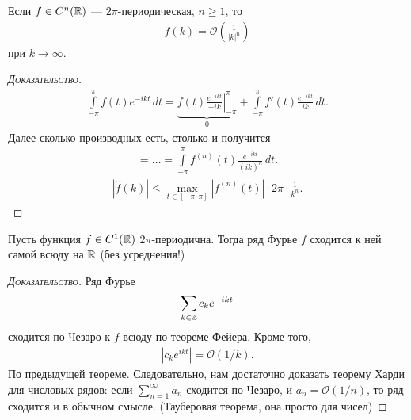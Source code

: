 \documentclass[../complex-analysis.tex]{subfiles}
\begin{document}
\begin{thm}
 Если $ f \in C^{n}(\mathbb{R}) $ --- $ 2\pi $-периодическая, $ n \geqslant 1 $, то 
 \begin{align*}
  \hat f(k) = \mathcal O\left( \frac{1}{\left| k \right|^{n}}\right)
 \end{align*} при $ k \to \infty $.
\end{thm}
\begin{proof}[\normalfont\textsc{Доказательство}]
 \begin{align*}
  \int\limits_{-\pi}^{\pi} f(t)e^{-ikt}\,dt = \underbrace{f(t) \left.\frac{e^{-ikt}}{-ik}\right|_{-\pi}^{\pi}}_{0} + \int\limits_{-\pi}^{\pi} f'(t) \frac{e^{-ikt}}{ik}\,dt.
 \end{align*} Далее сколько производных есть, столько и получится
 \begin{align*}
  = \ldots = \int\limits_{-\pi}^{\pi} f^{(n)}(t) \frac{ e^{-ikt}}{(ik)^{n}}\,dt.
 \end{align*}
 \begin{align*}
  \left| \hat f(k) \right| \leqslant \max_{t \in [-\pi,\pi]} \left| f^{(n)}(t) \right| \cdot 2\pi \cdot \frac{1}{k^{n}}.
 \end{align*}
\end{proof}

\begin{thm}[Харди]
 Пусть функция $ f \in C^{1}(\mathbb{R}) $ $ 2\pi $-периодична. Тогда ряд Фурье $ f $ сходится к ней самой всюду на $ \mathbb{R} $ (без усреднения!)
\end{thm}
\begin{proof}[\normalfont\textsc{Доказательство}]
 Ряд Фурье
 \begin{align*}
  \sum_{k \in \mathbb{Z}}c_k e^{-ikt}
 \end{align*} сходится по Чезаро к $ f $ всюду по теореме Фейера. Кроме того,
 \begin{align*}
  \left| c_ke^{ikt} \right| = \mathcal O(1 / k).
 \end{align*} По предыдущей теореме. Следовательно, нам достаточно доказать теорему Харди для числовых рядов: если $ \sum_{n=1}^{\infty} a_n $ сходится по Чезаро, и $ a_n = \mathcal O(1 / n) $, то ряд сходится и в обычном смысле. (Тауберовая теорема, она просто для чисел)
\end{proof}
\end{document}
